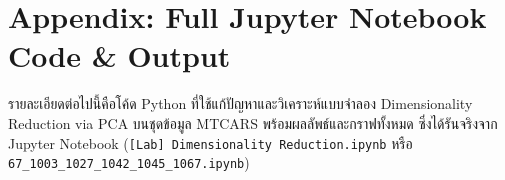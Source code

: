 \documentclass[12pt,a4paper]{article}
\begin{document}
\clearpage
\appendix
\raggedbottom
\section*{Appendix: Full Jupyter Notebook Code \& Output}

รายละเอียดต่อไปนี้คือโค้ด Python ที่ใช้แก้ปัญหาและวิเคราะห์แบบจำลอง Dimensionality Reduction via PCA บนชุดข้อมูล MTCARS พร้อมผลลัพธ์และกราฟทั้งหมด ซึ่งได้รันจริงจาก Jupyter Notebook (\texttt{[Lab] Dimensionality Reduction.ipynb} หรือ \texttt{67\_1003\_1027\_1042\_1045\_1067.ipynb})


\end{document}
